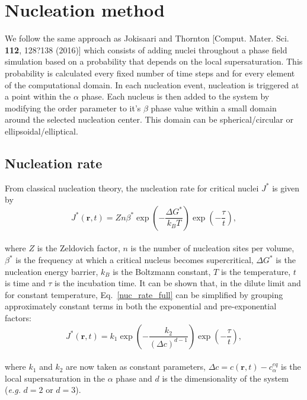 \documentclass[11pt]{article}
\renewcommand{\=}[1]{\stackrel{#1}{=}} %
\theoremstyle{definition}
\theoremstyle{remark}
\begin{document}
\section{Nucleation method}

We follow the same approach as Jokisaari and Thornton [Comput. Mater. Sci. {\bf 112}, 128?138 (2016)] which consists of adding nuclei throughout a phase field simulation based on a probability that depends on the local supersaturation. This probability is calculated every fixed number of time steps and for every element of the computational domain. In each nucleation event, nucleation is triggered at a point within the $\alpha$ phase. Each nucleus is then added to the system by modifying the order parameter to it's $\beta$ phase value within a small domain around the selected nucleation center. This domain can be spherical/circular or ellipsoidal/elliptical.  

\subsection{Nucleation rate}

From classical nucleation theory, the nucleation rate for critical nuclei $J^*$ is given by
\\
\begin{equation}
\label{nuc_rate_full}
J^*(\mathbf{r},t)=Zn\beta^*\exp \left( -\frac{\Delta G^*}{k_B T} \right) \exp \left( -\frac{\tau}{t} \right),
\end{equation}
\\
where $Z$ is the Zeldovich factor, $n$ is the number of nucleation sites per volume, $\beta^*$ is the frequency at which a critical nucleus becomes supercritical, $\Delta G^*$ is the nucleation energy barrier, $k_B$ is the Boltzmann constant, $T$ is the temperature, $t$ is time and $\tau$ is the incubation time. It can be shown that, in the dilute limit and for constant temperature, Eq.~\eqref{nuc_rate_full} can be simplified by grouping approximately constant terms in both the exponential and pre-exponential factors:
\\
\begin{equation}
\label{nuc_rate_simp}
J^*(\mathbf{r},t)=k_1\exp \left( -\frac{k_2}{(\Delta c)^{d-1}} \right) \exp \left(-\frac{\tau}{t} \right),
\end{equation}
\\
where  $k_1$ and $k_2$ are now taken as constant parameters, $\Delta c=c(\mathbf{r},t)-c_\alpha^{eq}$ is the local supersaturation in the $\alpha$ phase and $d$ is the dimensionality of the system ({\it e.g.} $d=2$ or $d=3$).\\
\end{document}
